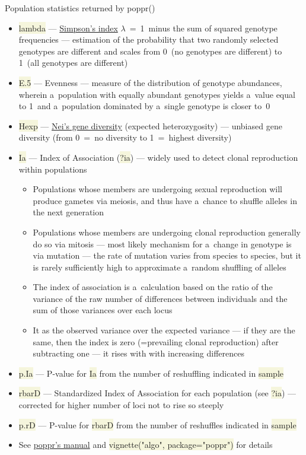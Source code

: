 \documentclass[compress, ucs, xelatex, 11pt, xcolor=svgnames, aspectratio=169,
	hyperref={
		bookmarks=true,
		unicode=true,
		colorlinks=true,
		pdftitle={Molecular data in R},
		plainpages=false,
		pdfauthor={Vojtech Zeisek},
		pdfsubject={Course about phylogeny and evolution in R},
		pdfcreator={XeLaTeX},
		pdfkeywords={R, evolution, phylogeny, molecular data},
		linkcolor=Crimson, %
		anchorcolor=Magenta, %
		citecolor=Magenta, %
		filecolor=Magenta, %
		menucolor=Magenta, %
		urlcolor=DodgerBlue, %
		pdftex},
	url={hyphens, lowtilde} %
	]{beamer}
\renewcommand{\texttt}[1]{\colorbox{Beige}{{\ttfamily #1}}}
\begin{document}
\begin{frame}[allowframebreaks]{Population statistics returned by poppr()}
\begin{itemize}
		\item \texttt{lambda} --- \href{https://en.wikipedia.org/wiki/Diversity_index\#Simpson_index}{Simpson's index} $\lambda$~=~1~minus the sum of squared genotype frequencies --- estimation of the probability that two randomly selected genotypes are different and scales from 0~(no genotypes are different) to 1~(all genotypes are different)
		\item \texttt{E.5} --- Evenness --- measure of the distribution of genotype abundances, wherein a~population with equally abundant genotypes yields a~value equal to 1~and a~population dominated by a~single genotype is closer to~0
		\item \texttt{Hexp} --- \href{https://www.genetics.org/content/89/3/583}{Nei's gene diversity} (expected heterozygosity) --- unbiased gene diversity (from 0~=~no diversity to 1~=~highest diversity)
		\item \texttt{Ia} --- Index of Association (\texttt{?ia}) --- widely used to detect clonal reproduction within populations
		\begin{itemize}
			\item Populations whose members are undergoing sexual reproduction will produce gametes via meiosis, and thus have a~chance to shuffle alleles in the next generation
			\item Populations whose members are undergoing clonal reproduction generally do so via mitosis --- most likely mechanism for a~change in genotype is via mutation --- the rate of mutation varies from species to species, but it is rarely sufficiently high to approximate a~random shuffling of alleles
			\item The index of association is a~calculation based on the ratio of the variance of the raw number of differences between individuals and the sum of those variances over each locus
			\item It as the observed variance over the expected variance --- if they are the same, then the index is zero (=prevailing clonal reproduction) after subtracting one --- it rises with with increasing differences
		\end{itemize}
		\item \texttt{p.Ia} --- P-value for \texttt{Ia} from the number of reshuffling indicated in \texttt{sample}
		\item \texttt{rbarD} --- Standardized Index of Association for each population (see \texttt{?ia}) --- corrected for higher number of loci not to rise so steeply
		\item \texttt{p.rD} --- P-value for \texttt{rbarD} from the number of reshuffles indicated in \texttt{sample}
		\item See \href{https://grunwaldlab.github.io/Population_Genetics_in_R/}{poppr's manual} and \texttt{vignette("algo", package="poppr")} for details
	\end{itemize}
\end{frame}
\end{document}
